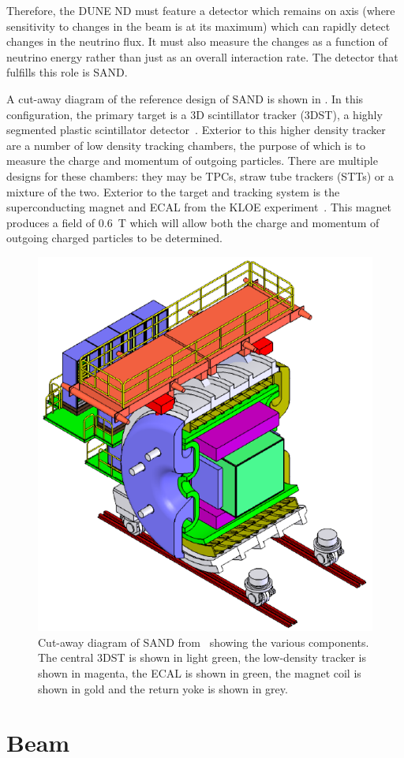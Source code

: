 Therefore, the DUNE ND must feature a detector which remains on axis (where sensitivity to changes in the beam is at its maximum) which can rapidly detect changes in the neutrino flux.
It must also measure the changes as a function of neutrino energy rather than just as an overall interaction rate.
The detector that fulfills this role is SAND.

A cut-away diagram of the reference design of SAND is shown in .
In this configuration, the primary target is a 3D scintillator tracker (3DST), a highly segmented plastic scintillator detector~\cite{3dst}.
Exterior to this higher density tracker are a number of low density tracking chambers, the purpose of which is to measure the charge and momentum of outgoing particles.
There are multiple designs for these chambers: they may be TPCs, straw tube trackers (STTs) or a mixture of the two.
Exterior to the target and tracking system is the superconducting magnet and ECAL from the KLOE experiment~\cite{kloeEcal}.
This magnet produces a field of \SI{0.6}{\tesla} which will allow both the charge and momentum of outgoing charged particles to be determined.

\begin{figure}[h]
  \centering
  \includegraphics[width=.55\linewidth]{files/figures/dune_detector/sandDiag}
  \caption[Cut-away diagram of SAND]{Cut-away diagram of SAND from~\cite{ndCdr} showing the various components. The central 3DST is shown in light green, the low-density tracker is shown in magenta, the ECAL is shown in green, the magnet coil is shown in gold and the return yoke is shown in grey.}
  \label{fig:sandDiag}
\end{figure}

\section{Beam}
\label{sec:dune:beam}

